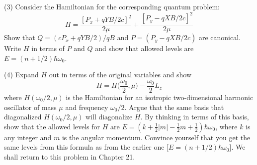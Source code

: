 \documentclass[../principles-of-quantum-mechanics.tex]{subfiles}
\begin{document}
\begin{questions}
	(3) Consider the Hamiltonian for the corresponding quantum problem:
	$$H = \frac{[P_x + qYB/2c]^2}{2\mu} + \frac{[P_y - qXB/2c]^2}{2\mu}$$
	Show that $Q = (cP_x + qYB/2)/qB$ and $P = (P_y - qXB/2c)$ are canonical. Write $H$ in terms of $P$ and $Q$ and show that allowed levels are $E = (n + 1/2)\hbar\omega_0$.
	
	(4) Expand $H$ out in terms of the original variables and show
	$$H = H\Big(\frac{\omega_0}{2}, \mu\Big) - \frac{\omega_0}{2}L_z$$
	where $H(\omega_0/2, \mu)$ is the Hamiltonian for an isotropic two-dimensional harmonic oscillator of mass $\mu$ and frequency $\omega_0/2$. Argue that the same basis that diagonalized $H(\omega_0/2, \mu)$ will diagonalize $H$. By thinking in terms of this basis, show that the allowed levels for $H$ are $E = (k + \tfrac{1}{2}|m| - \tfrac{1}{2}m + \tfrac{1}{2})\hbar\omega_0$, where $k$ is any integer and $m$ is the angular momentum. Convince yourself that you get the same levels from this formula as from the earlier one [$E = (n + 1/2)\hbar\omega_0$]. We shall return to this problem in Chapter 21.


\end{questions}
\end{document}
